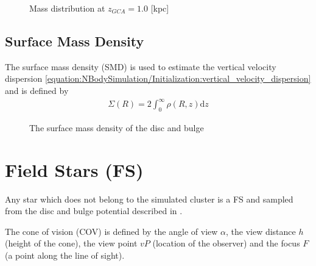\documentclass[letterpaper,10pt,english]{sphinxmanual}
\begin{document}
				\begin{figure}[htbp]
				\centering
				\capstart
				
				\noindent{}
				\caption{Mass distribution at \(z_{GCA} = 1.0\) {[}kpc{]}}\label{\detokenize{NBodySimulation/Potential:id10}}\label{\detokenize{NBodySimulation/Potential:fig-potential-mass-distribution}}\end{figure}
			
			
			\subsection{Surface Mass Density}
				\label{\detokenize{NBodySimulation/Potential:surface-mass-density}}
				\sphinxAtStartPar
				The surface mass density (SMD) is used to estimate the vertical velocity dispersion \eqref{equation:NBodySimulation/Initialization:vertical_velocity_dispersion} and is defined by
				\begin{equation}\label{equation:NBodySimulation/Potential:surface_mass_density}
				\begin{split}\Sigma \left ( R \right )=2\int_{0}^{\infty}\rho \left ( R,z \right )\mathrm{d}z\end{split}
				\end{equation}
				\begin{figure}[htbp]
				\centering
				\capstart
				
				\noindent{}
				\caption{The surface mass density of the disc and bulge}\label{\detokenize{NBodySimulation/Potential:id11}}\label{\detokenize{NBodySimulation/Potential:fig-potential-surface-density}}\end{figure}


		\section{Field Stars (FS)}
			\label{\detokenize{NBodySimulation/Initialization:field-stars-fs}}
			\sphinxAtStartPar
			Any star which does not belong to the simulated cluster is a FS and sampled from the disc and bulge potential described in {\hyperref[\detokenize{NBodySimulation/Potential:galactic-potential-label}]{}}.
			
			\sphinxAtStartPar
			The cone of vision (COV) is defined by the angle of view \(\alpha\), the view distance \(h\) (height of the cone), the view point \(vP\) (location of the observer) and the focus \(F\) (a point along the line of sight).
			
\end{document}
